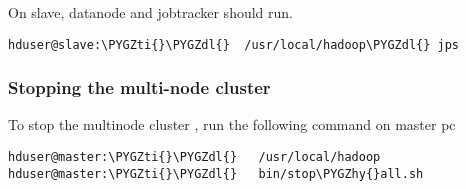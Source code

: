 \documentclass[letterpaper,10pt,english]{sphinxmanual}
\def\PYGZdl{\char`\$}
\def\PYGZhy{\char`\-}
\def\PYGZti{\char`\~}
\begin{document}
On slave, datanode and jobtracker should run.

\begin{Verbatim}[commandchars=\\\{\}]
hduser@slave:\PYGZti{}\PYGZdl{}  /usr/local/hadoop\PYGZdl{} jps
\end{Verbatim}


\subsubsection{Stopping the multi-node cluster}
\label{hadoop:stopping-the-multi-node-cluster}
To stop the multinode cluster , run the following command on master pc

\begin{Verbatim}[commandchars=\\\{\}]
hduser@master:\PYGZti{}\PYGZdl{}   /usr/local/hadoop
hduser@master:\PYGZti{}\PYGZdl{}   bin/stop\PYGZhy{}all.sh
\end{Verbatim}
\end{document}
